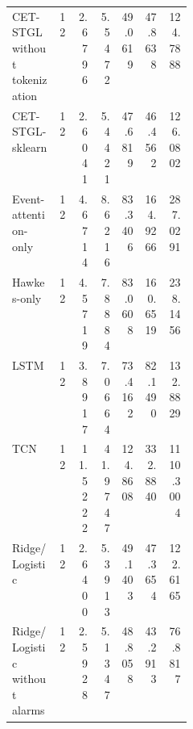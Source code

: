 \begin{longtable}{@{}p{0.26\linewidth}rrrrrr@{}}
CET-STGL without tokenization & 12 & 2.6796 & 5.5472 & 49.0619 & 47.8638 & 124.7888 \\
CET-STGL-sklearn & 12 & 2.6041 & 5.4421 & 47.6819 & 46.4562 & 126.0802 \\
Event-attention-only & 12 & 4.6714 & 8.6216 & 83.3406 & 164.9266 & 287.0291 \\
Hawkes-only & 12 & 4.5719 & 7.8884 & 83.0608 & 160.6519 & 238.1456 \\
LSTM & 12 & 3.8917 & 7.0664 & 73.4162 & 82.1490 & 132.8829 \\
TCN & 12 & 11.5222 & 41.9747 & 124.8608 & 332.8840 & 1110.3004 \\
Ridge/Logistic & 12 & 2.6400 & 5.3913 & 49.1403 & 47.3654 & 122.6165 \\
Ridge/Logistic without alarms & 12 & 2.5928 & 5.1347 & 48.8058 & 43.2913 & 76.8817 \\
\bottomrule
\end{longtable}
\endgroup
